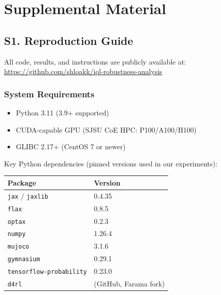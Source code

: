 \documentclass[conference]{IEEEtran}
\begin{document}

\newpage
\appendix

\section*{Supplemental Material}

\subsection*{S1. Reproduction Guide}

All code, results, and instructions are publicly available at:\\
\url{https://github.com/shloakk/iql-robustness-analysis}

\subsubsection*{System Requirements}

\begin{itemize}
  \item Python 3.11 (3.9+ supported)
  \item CUDA-capable GPU (SJSU CoE HPC: P100/A100/H100)
  \item GLIBC 2.17+ (CentOS 7 or newer)
\end{itemize}

Key Python dependencies (pinned versions used in our experiments):

\begin{center}
\small
\begin{tabular}{ll}
  \toprule
  Package & Version \\
  \midrule
  \texttt{jax} / \texttt{jaxlib} & 0.4.35 \\
  \texttt{flax}                  & 0.8.5  \\
  \texttt{optax}                 & 0.2.3  \\
  \texttt{numpy}                 & 1.26.4 \\
  \texttt{mujoco}                & 3.1.6  \\
  \texttt{gymnasium}             & 0.29.1 \\
  \texttt{tensorflow-probability}& 0.23.0 \\
  \texttt{d4rl}                  & (GitHub, Farama fork) \\
  \bottomrule
\end{tabular}
\end{center}
\end{document}
